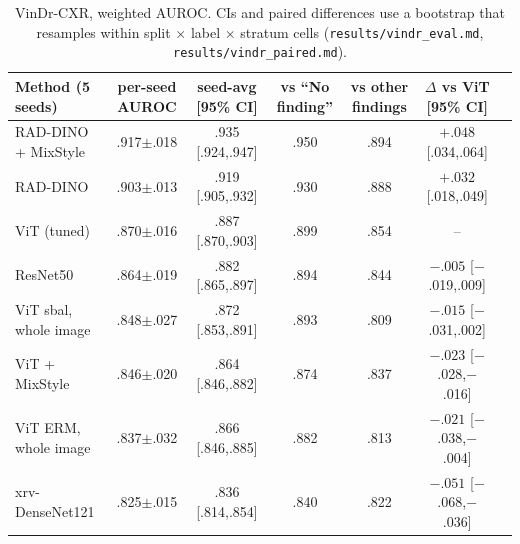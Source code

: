\documentclass[10pt,a4paper]{article}
\begin{document}
\begin{table}[H]\centering\footnotesize\setlength{\tabcolsep}{3.6pt}
\begin{tabular}{lcccccc}\toprule
Method (5 seeds) & per-seed AUROC & seed-avg [95\% CI] & vs ``No finding'' & vs other findings & $\Delta$ vs ViT [95\% CI]\\\midrule
RAD-DINO + MixStyle & .917$\pm$.018 & .935 [.924,.947] & .950 & .894 & $+.048$ [.034,.064]\\
RAD-DINO & .903$\pm$.013 & .919 [.905,.932] & .930 & .888 & $+.032$ [.018,.049]\\
ViT (tuned) & .870$\pm$.016 & .887 [.870,.903] & .899 & .854 & --\\
ResNet50 & .864$\pm$.019 & .882 [.865,.897] & .894 & .844 & $-.005$ [$-$.019,.009]\\
ViT sbal, whole image & .848$\pm$.027 & .872 [.853,.891] & .893 & .809 & $-.015$ [$-$.031,.002]\\
ViT + MixStyle & .846$\pm$.020 & .864 [.846,.882] & .874 & .837 & $-.023$ [$-$.028,$-$.016]\\
ViT ERM, whole image & .837$\pm$.032 & .866 [.846,.885] & .882 & .813 & $-.021$ [$-$.038,$-$.004]\\
xrv-DenseNet121 & .825$\pm$.015 & .836 [.814,.854] & .840 & .822 & $-.051$ [$-$.068,$-$.036]\\\bottomrule
\end{tabular}\caption{VinDr-CXR, weighted AUROC. CIs and paired differences use a bootstrap that resamples within split $\times$ label $\times$ stratum cells (\texttt{results/vindr\_eval.md}, \texttt{results/vindr\_paired.md}).}\label{tab:vindr}\end{table}
\end{document}
